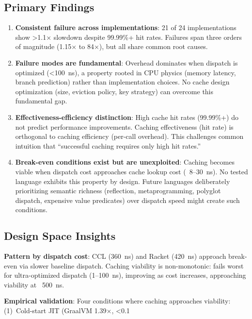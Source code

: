 \documentclass[sigplan,final,acmsmall,review,screen]{acmart}
\begin{document}
\subsection{Primary Findings}

\begin{enumerate}
  \item \textbf{Consistent failure across implementations}: 21 of 24 implementations show >1.1× slowdown despite 99.99\%+ hit rates.
    Failures span three orders of magnitude (1.15× to 84×), but all share common root causes.

  \item \textbf{Failure modes are fundamental}: Overhead dominates when dispatch is optimized (<100~ns), a property
    rooted in CPU physics (memory latency, branch prediction) rather than implementation choices. No cache design optimization
    (size, eviction policy, key strategy) can overcome this fundamental gap.

  \item \textbf{Effectiveness-efficiency distinction}: High cache hit rates (99.99\%+) do not predict performance improvements.
    Caching effectiveness (hit rate) is orthogonal to caching efficiency (per-call overhead). This challenges common intuition
    that ``successful caching requires only high hit rates.''

  \item \textbf{Break-even conditions exist but are unexploited}: Caching becomes viable when dispatch cost approaches cache lookup cost
    (~8--30~ns). No tested language exhibits this property by design. Future languages deliberately prioritizing semantic richness
    (reflection, metaprogramming, polyglot dispatch, expensive value predicates) over dispatch speed might create such conditions.
\end{enumerate}

\subsection{Design Space Insights}

\textbf{Pattern by dispatch cost}: CCL (360~ns) and Racket (420~ns) approach break-even via slower baseline dispatch. Caching viability is non-monotonic: fails worst for ultra-optimized dispatch (1--100~ns), improving as cost increases, approaching viability at ~500~ns.

\textbf{Empirical validation}: Four conditions where caching approaches viability: (1)~Cold-start JIT (GraalVM 1.39×, <0.1%
\end{document}
